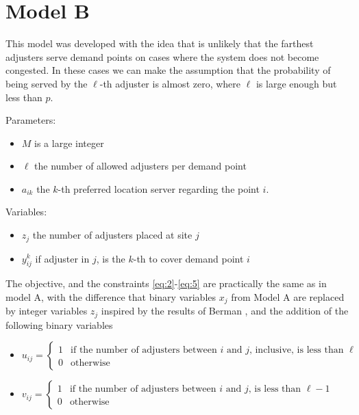 
\section{Model B}

This model
was developed with the idea
that is unlikely that the farthest adjusters
serve demand points
on cases where the system does not become congested.
In these cases
we can make the assumption that
the probability of being served by the $\ell$-th 
adjuster is almost zero,
where $\ell$ is large enough but less than $p$.

Parameters:
\begin{itemize}
\item $M$ is a large integer
\item $\ell$ the number of allowed adjusters per demand point
\item $a_{ik}$ the $k$-th preferred location server
  regarding the point $i$.
\end{itemize}

Variables:
\begin{itemize}
\item $z_j$ the number of adjusters placed at site $j$
\item $y_{ij}^k$ if adjuster in $j$,
  is the $k$-th to cover demand point $i$
\end{itemize}

The objective,
and the constraints \ref{eq:2}-\ref{eq:5} 
are practically the same as in model A,
with the difference that
binary variables $x_j$ from Model A
are replaced by integer variables $z_j$
inspired by the results of Berman \cite{berman1987stochastic},
and the addition of the following binary variables
\begin{itemize}
\item $u_{ij} = 
  \begin{cases}
    1 & \mbox{if the number of adjusters between } i 
    \mbox{ and } j \mbox{, inclusive, is less than } \ell \\
    0 & \mbox{otherwise}
  \end{cases}$
\item $v_{ij} = 
  \begin{cases} 
    1 & \mbox{if the number of adjusters between } i
    \mbox{ and } j \mbox{, is less than } \ell - 1 \\
    0 & \mbox{otherwise}
  \end{cases}$
\end{itemize}

